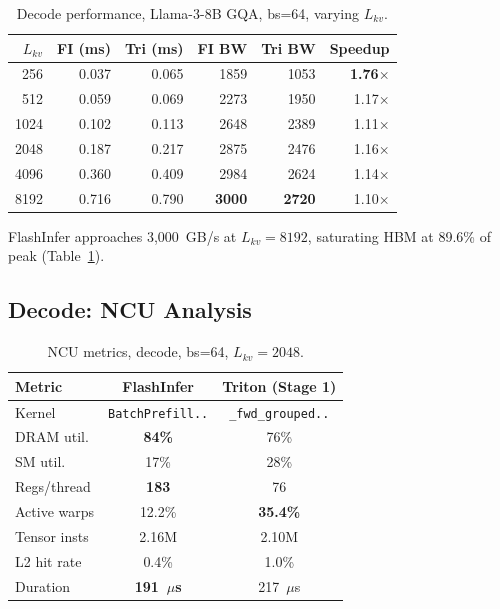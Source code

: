 \documentclass[10pt,twocolumn]{article}
\begin{document}
\begin{table}[h]
\centering
\small
\caption{Decode performance, Llama-3-8B GQA, bs=64, varying $L_{kv}$.}
\label{tab:decode_kv}
\begin{tabular}{@{}rrrrrr@{}}
\toprule
$L_{kv}$ & FI (ms) & Tri (ms) & FI BW & Tri BW & Speedup \\
\midrule
  256 & 0.037 & 0.065 & 1859 & 1053 & \textbf{1.76$\times$} \\
  512 & 0.059 & 0.069 & 2273 & 1950 & 1.17$\times$ \\
 1024 & 0.102 & 0.113 & 2648 & 2389 & 1.11$\times$ \\
 2048 & 0.187 & 0.217 & 2875 & 2476 & 1.16$\times$ \\
 4096 & 0.360 & 0.409 & 2984 & 2624 & 1.14$\times$ \\
 8192 & 0.716 & 0.790 & \textbf{3000} & \textbf{2720} & 1.10$\times$ \\
\bottomrule
\end{tabular}
\end{table}

FlashInfer approaches 3,000~GB/s at $L_{kv}=8192$, saturating HBM at 89.6\% of peak (Table~\ref{tab:decode_kv}).

\subsection{Decode: NCU Analysis}

\begin{table}[h]
\centering
\small
\caption{NCU metrics, decode, bs=64, $L_{kv}=2048$.}
\label{tab:ncu_decode}
\begin{tabular}{@{}lcc@{}}
\toprule
Metric & FlashInfer & Triton (Stage 1) \\
\midrule
Kernel       & \texttt{BatchPrefill..} & \texttt{\_fwd\_grouped..} \\
DRAM util.   & \textbf{84\%} & 76\% \\
SM util.     & 17\% & 28\% \\
Regs/thread  & \textbf{183} & 76 \\
Active warps & 12.2\% & \textbf{35.4\%} \\
Tensor insts & 2.16M & 2.10M \\
L2 hit rate  & 0.4\% & 1.0\% \\
Duration     & \textbf{191~$\mu$s} & 217~$\mu$s \\
\bottomrule
\end{tabular}
\end{table}
\end{document}
